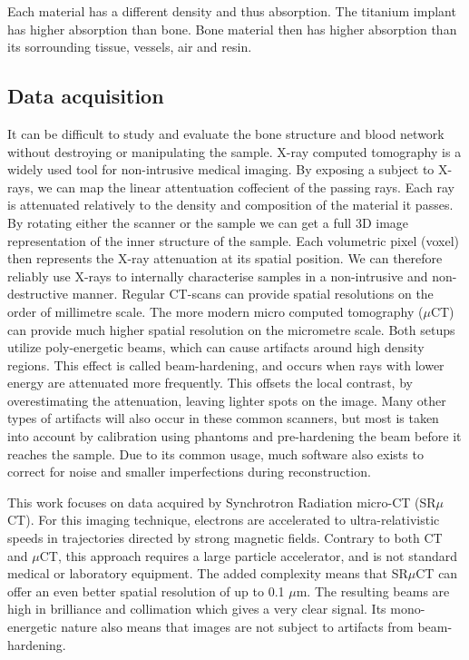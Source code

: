 Each material has a different density and thus absorption. The titanium implant has higher absorption than bone.
Bone material then has higher absorption than its sorrounding tissue, vessels, air and resin.

\subsection{Data acquisition}

It can be difficult to study and evaluate the bone structure and blood network without destroying or
manipulating the sample. X-ray computed tomography is a widely used tool for non-intrusive medical
imaging. By exposing a subject to X-rays, we can map the linear attentuation coffecient of the passing
rays. Each ray is attenuated relatively to the density and composition of the material it passes. By
rotating either the scanner or the sample we can get a full 3D image representation of the inner
structure of the sample. Each volumetric pixel (voxel) then represents the X-ray attenuation at its spatial position. We can therefore reliably use X-rays to internally characterise samples in a non-intrusive and non-destructive manner. Regular CT-scans can provide spatial resolutions on the order of millimetre scale. The more modern micro computed tomography ($\mu$CT) can provide much higher spatial resolution on the micrometre scale. Both setups utilize poly-energetic beams, which can cause artifacts around high density regions. This effect is called beam-hardening, and occurs when rays with lower energy are attenuated more frequently. This offsets the local contrast, by overestimating the attenuation, leaving lighter spots on the image. Many other types of artifacts will also occur in these common scanners, but most is taken into account by calibration using phantoms and pre-hardening the beam before it reaches the sample. Due to its common usage, much software also exists to correct for noise and smaller imperfections during reconstruction.

This work focuses on data acquired by Synchrotron Radiation micro-CT (SR$\mu$CT). For this imaging
technique, electrons are accelerated to ultra-relativistic speeds in trajectories directed by strong
magnetic fields. Contrary to both CT and $\mu$CT, this approach requires a large particle accelerator, and is not standard medical or laboratory equipment. The added complexity means that SR$\mu$CT can offer an even better spatial resolution of up to 0.1 $\mu$m. The resulting beams are high in brilliance and collimation which gives a very clear signal. Its mono-energetic nature also means that images are not subject to artifacts from beam-hardening.


